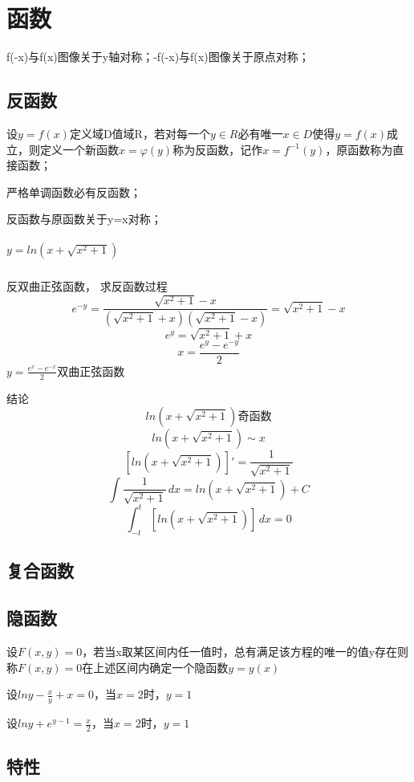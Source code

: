 
\chapter{函数}

f(-x)与f(x)图像关于y轴对称；-f(-x)与f(x)图像关于原点对称；

\section{反函数}
设\(y = f(x)\)定义域D值域R，若对每一个\(y \in R\)必有唯一\(x \in D\)使得\(y = f(x)\)成立，则定义一个新函数\(x = \varphi(y)\)称为反函数，记作\(x = f^{-1}(y)\)，原函数称为直接函数；

严格单调函数必有反函数；

反函数与原函数关于y=x对称；

\paragraph{\(y = ln(x + \sqrt{x^2 + 1})\)}
反双曲正弦函数，
求反函数过程
\[e^{-y} = \frac{\sqrt{x^2 + 1} - x}{(\sqrt{x^2 + 1} + x)(\sqrt{x^2 + 1} - x)} = \sqrt{x^2 + 1} - x\]
\[e^y = \sqrt{x^2 + 1} + x\]
\[x = \frac{e^y - e^{-y}}{2}\]
\(y = \frac{e^x - e^{-x}}{2}\)双曲正弦函数

结论
\[ln(x + \sqrt{x^2 + 1})\text{奇函数}\]
\[ln(x + \sqrt{x^2 + 1}) \sim x\]
\[[ln(x + \sqrt{x^2 + 1})]' = \frac{1}{\sqrt{x^2 + 1}}\]
\[\int \frac{1}{\sqrt{x^2 + 1}}\,dx = ln(x + \sqrt{x^2 + 1}) + C\]
\[\int_{-t}^{t} [ln(x + \sqrt{x^2 + 1})] \,dx = 0\]


\section{复合函数}


\section{隐函数}
设\(F(x, y) = 0\)，若当x取某区间内任一值时，总有满足该方程的唯一的值y存在则称\(F(x, y) = 0\)在上述区间内确定一个隐函数\(y = y(x)\)

设\(lny - \frac{x}{y} + x = 0\)，当\(x = 2\)时，\(y = 1\)

设\(lny + e^{y - 1} = \frac{x}{2}\)，当\(x = 2\)时，\(y = 1\)


\section{特性}

